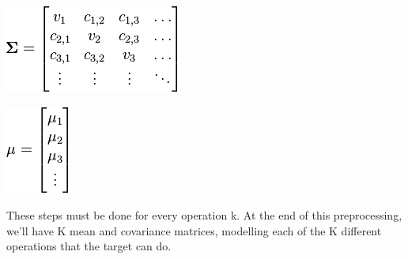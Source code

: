 \begin{itemize}
      \begin{minipage}{\linewidth}
      \centering
      \includegraphics[scale=0.7]{images/Lecture_5/pic5.png}
      \end{minipage}
      \begin{minipage}{\linewidth}
      \centering
      \includegraphics[scale=0.7]{images/Lecture_5/pic4.png}
      \end{minipage}
      
    \end{itemize}
    
    These steps must be done for every operation k. At the end of this
    preprocessing, we'll have K mean and covariance matrices, modelling each of
    the K different operations that the target can do.


